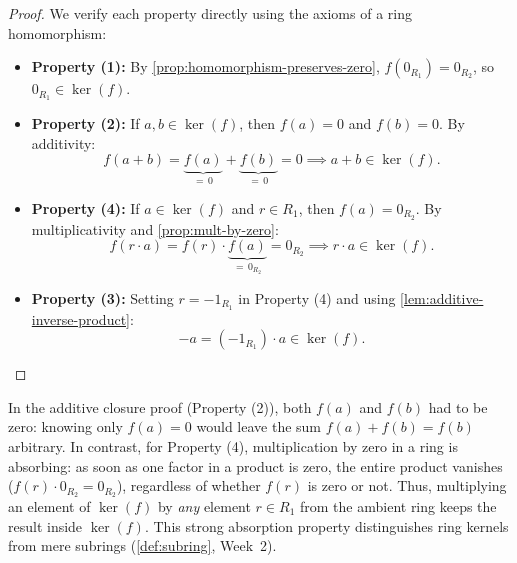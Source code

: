 \begin{content}

\begin{proof}
We verify each property directly using the axioms of a ring homomorphism:
\begin{itemize}
    \item \textbf{Property (1):} By \cref{prop:homomorphism-preserves-zero}, $f(0_{R_1}) = 0_{R_2}$, so $0_{R_1} \in \ker(f)$.
    \item \textbf{Property (2):} If $a, b \in \ker(f)$, then $f(a) = 0$ and $f(b) = 0$. By additivity:
    \[
    f(a + b) = \underbrace{f(a)}_{=\,0} + \underbrace{f(b)}_{=\,0} = 0 \implies a + b \in \ker(f).
    \]
    \item \textbf{Property (4):} If $a \in \ker(f)$ and $r \in R_1$, then $f(a) = 0_{R_2}$. By multiplicativity and \cref{prop:mult-by-zero}:
    \[
    f(r \cdot a) = f(r) \cdot \underbrace{f(a)}_{=\,0_{R_2}} = 0_{R_2} \implies r \cdot a \in \ker(f).
    \]
    \item \textbf{Property (3):} Setting $r = -1_{R_1}$ in Property (4) and using \cref{lem:additive-inverse-product}:
    \[
    -a = (-1_{R_1}) \cdot a \in \ker(f).
    \]
\end{itemize}
\end{proof}

\begin{steps}
In the additive closure proof (Property (2)), both $f(a)$ and $f(b)$ had to be zero: knowing only $f(a) = 0$ would leave the sum $f(a) + f(b) = f(b)$ arbitrary. In contrast, for Property (4), multiplication by zero in a ring is absorbing: as soon as one factor in a product is zero, the entire product vanishes ($f(r) \cdot 0_{R_2} = 0_{R_2}$), regardless of whether $f(r)$ is zero or not. Thus, multiplying an element of $\ker(f)$ by \emph{any} element $r \in R_1$ from the ambient ring keeps the result inside $\ker(f)$. This strong absorption property distinguishes ring kernels from mere subrings (\cref{def:subring}, Week~2).
\end{steps}
\end{content}


